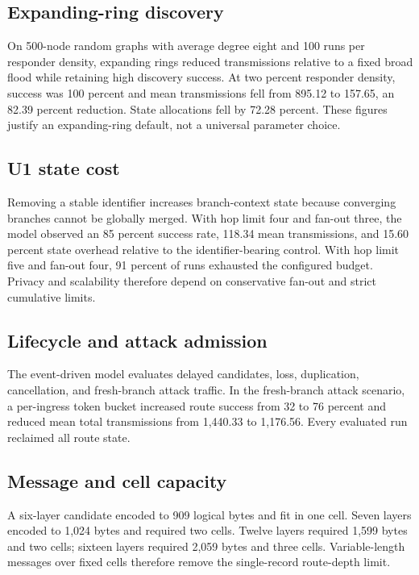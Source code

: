 \documentclass[11pt,oneside]{article}
\begin{document}
\subsection{Expanding-ring discovery}

On 500-node random graphs with average degree eight and 100 runs per responder density, expanding rings reduced transmissions relative to a fixed broad flood while retaining high discovery success. At two percent responder density, success was 100 percent and mean transmissions fell from 895.12 to 157.65, an 82.39 percent reduction. State allocations fell by 72.28 percent. These figures justify an expanding-ring default, not a universal parameter choice.

\subsection{U1 state cost}

Removing a stable identifier increases branch-context state because converging branches cannot be globally merged. With hop limit four and fan-out three, the model observed an 85 percent success rate, 118.34 mean transmissions, and 15.60 percent state overhead relative to the identifier-bearing control. With hop limit five and fan-out four, 91 percent of runs exhausted the configured budget. Privacy and scalability therefore depend on conservative fan-out and strict cumulative limits.

\subsection{Lifecycle and attack admission}

The event-driven model evaluates delayed candidates, loss, duplication, cancellation, and fresh-branch attack traffic. In the fresh-branch attack scenario, a per-ingress token bucket increased route success from 32 to 76 percent and reduced mean total transmissions from 1,440.33 to 1,176.56. Every evaluated run reclaimed all route state.

\subsection{Message and cell capacity}

A six-layer candidate encoded to 909 logical bytes and fit in one cell. Seven layers encoded to 1,024 bytes and required two cells. Twelve layers required 1,599 bytes and two cells; sixteen layers required 2,059 bytes and three cells. Variable-length messages over fixed cells therefore remove the single-record route-depth limit.
\end{document}
